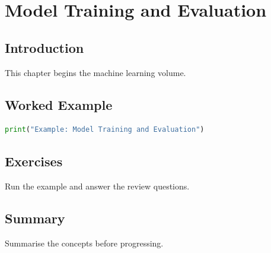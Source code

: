 \chapter{Model Training and Evaluation}
\label{chap:vol6-4}



\section{Introduction}
This chapter begins the machine learning volume.

\section{Worked Example}
\begin{lstlisting}[language=Python]
print("Example: Model Training and Evaluation")
\end{lstlisting}

\section{Exercises}
\begin{exercise}
Run the example and answer the review questions.
\end{exercise}

\section{Summary}
Summarise the concepts before progressing.
